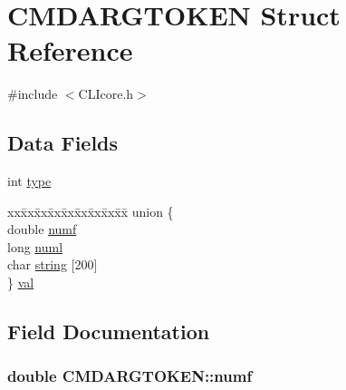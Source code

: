 \hypertarget{structCMDARGTOKEN}{}\section{C\+M\+D\+A\+R\+G\+T\+O\+K\+E\+N Struct Reference}
\label{structCMDARGTOKEN}


{\ttfamily \#include $<$C\+L\+Icore.\+h$>$}

\subsection*{Data Fields}
\begin{DoxyCompactItemize}
\item 
int \hyperlink{structCMDARGTOKEN_a268f75c3a394c9466df7aba70dc76c00}{type}
\item 
\begin{tabbing}
xx\=xx\=xx\=xx\=xx\=xx\=xx\=xx\=xx\=\kill
union \{\\
\>double \hyperlink{structCMDARGTOKEN_a8f29c19d721dbe26248fc92c01c0e497}{numf}\\
\>long \hyperlink{structCMDARGTOKEN_a8ef8bd8dde032f117c7c316dee08a7c9}{numl}\\
\>char \hyperlink{structCMDARGTOKEN_ac74ef24422dc07823178ebbe43b7ad10}{string} \mbox{[}200\mbox{]}\\
\} \hyperlink{structCMDARGTOKEN_a96839ddcbefc8d1629d9be94a1319bc3}{val}\\

\end{tabbing}\end{DoxyCompactItemize}


\subsection{Field Documentation}
\hypertarget{structCMDARGTOKEN_a8f29c19d721dbe26248fc92c01c0e497}{}
\subsubsection[{numf}]{\setlength{\rightskip}{0pt plus 5cm}double C\+M\+D\+A\+R\+G\+T\+O\+K\+E\+N\+::numf}\label{structCMDARGTOKEN_a8f29c19d721dbe26248fc92c01c0e497}
\hypertarget{structCMDARGTOKEN_a8ef8bd8dde032f117c7c316dee08a7c9}{}
